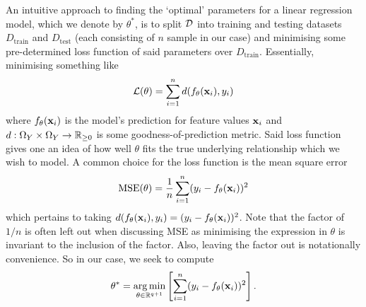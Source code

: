 \documentclass[11pt]{article}
\begin{document}
An intuitive approach to finding the `optimal' parameters for a linear regression model, which we denote by $\theta^{*}$, is to split $\mathcal{D}$ into training and testing datasets $D_{\text{train}}$ and $D_{\text{test}}$ (each consisting of $n$ sample in our case) and minimising some pre-determined loss function of said parameters over $D_{\text{train}}$. Essentially, minimising something like
$$
\mathcal{L}(\theta)=\sum_{i=1}^nd(f_{\theta}(\mathbf{x}_i), y_i)
$$
where $f_{\theta}(\mathbf{x}_i)$ is the model's prediction for feature values $\mathbf{x}_i$ and $d:\Omega_Y\times\Omega_Y\rightarrow\mathbb{R}_{\geq0}$ is some goodness-of-prediction metric. Said loss function gives one an idea of how well $\theta$ fits the true underlying relationship which we wish to model. A common choice for the loss function is the mean square error
$$
\text{MSE}(\theta)=\frac{1}{n}\sum_{i=1}^n(y_i-f_{\theta}(\mathbf{x}_i))^2
$$
which pertains to taking $d(f_{\theta}(\mathbf{x}_i), y_i)=(y_i-f_{\theta}(\mathbf{x}_i))^2$. Note that the factor of $1/n$ is often left out when discussing MSE as minimising the expression in $\theta$ is invariant to the inclusion of the factor. Also, leaving the factor out is notationally convenience. So in our case, we seek to compute
$$
\theta^{*}=\operatorname*{arg\,min}_{\theta\in\mathbb{R}^{q+1}}\left[\sum_{i=1}^n(y_i-f_{\theta}(\mathbf{x}_i))^2\right].
$$
\end{document}
